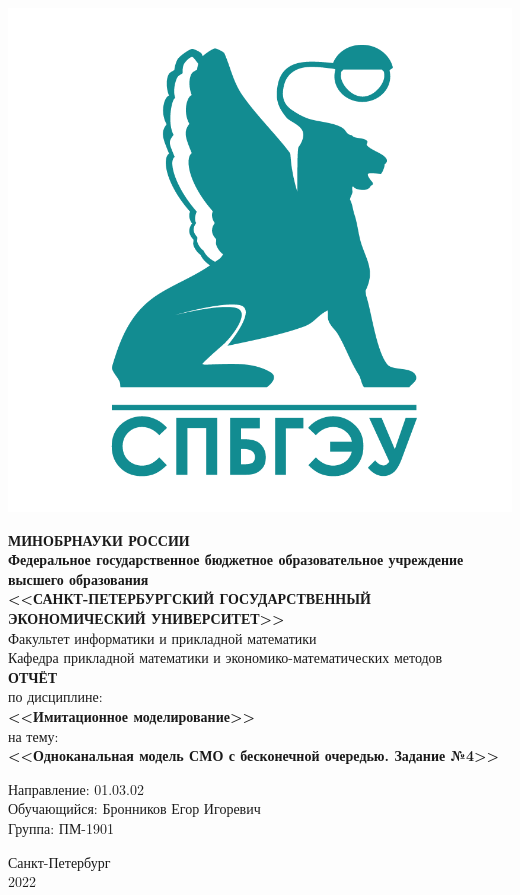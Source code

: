 \documentclass[14pt,fleqn]{extarticle}
\begin{document}
	\begin{titlepage}
		\includegraphics[scale=0.12]{logo}
		\begin{center}
			\textbf{МИНОБРНАУКИ РОССИИ}\\
			\vspace{0.2cm}
			\textbf{Федеральное государственное бюджетное образовательное учреждение высшего образования}\\
			\textbf{<<САНКТ-ПЕТЕРБУРГСКИЙ ГОСУДАРСТВЕННЫЙ ЭКОНОМИЧЕСКИЙ УНИВЕРСИТЕТ>>}\\
			\vspace{0.6cm}
			Факультет информатики и прикладной математики\\
			Кафедра прикладной математики и экономико-математических методов\\
			\vspace{1cm}
			\textbf{ОТЧЁТ}\\
			по дисциплине:\\
			\textbf{<<Имитационное моделирование>>}\\
			на тему:\\
			\textbf{<<Одноканальная модель СМО с бесконечной очередью. Задание №4>>}\\
		\end{center}
		\vspace{1cm}
		Направление: 01.03.02\\
		Обучающийся: Бронников Егор Игоревич\\
		Группа: ПМ-1901\\
		\vfill
		\begin{center}
			Санкт-Петербург\\
			2022\\
		\end{center}
	\end{titlepage}
\end{document}
